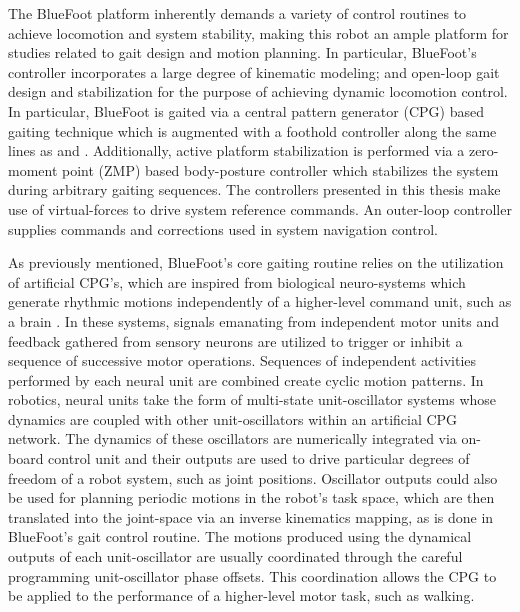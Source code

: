 		The BlueFoot platform inherently demands a variety of control routines to achieve locomotion and system stability, making this robot an ample platform for studies related to gait design and motion planning. In particular, BlueFoot's controller incorporates a large degree of kinematic modeling; and open-loop gait design and stabilization for the purpose of achieving dynamic locomotion control. In particular, BlueFoot is gaited via a central pattern generator (CPG) based gaiting technique which is augmented with a foothold controller along the same lines as \cite{Ajallooeian2013} and \cite{Rutishauser2008}. Additionally, active platform stabilization is performed via a zero-moment point (ZMP) based body-posture controller which stabilizes the system during arbitrary gaiting sequences. The controllers presented in this thesis make use of virtual-forces to drive system reference commands. An outer-loop controller supplies commands and corrections used in system navigation control.

		As previously mentioned, BlueFoot's core gaiting routine relies on the utilization of artificial CPG's, which are inspired from biological neuro-systems which generate rhythmic motions independently of a higher-level command unit, such as a brain \cite{Ijspeert2008}. In these systems, signals emanating from independent motor units and feedback gathered from sensory neurons are utilized to trigger or inhibit a sequence of successive motor operations. Sequences of independent activities performed by each neural unit are combined create cyclic motion patterns. In robotics, neural units take the form of multi-state unit-oscillator systems whose dynamics are coupled with other unit-oscillators within an artificial CPG network. The dynamics of these oscillators are numerically integrated via on-board control unit and their outputs are used to drive particular degrees of freedom of a robot system, such as joint positions. Oscillator outputs could also be used for planning periodic motions in the robot's task space, which are then translated into the joint-space via an inverse kinematics mapping, as is done in BlueFoot's gait control routine. The motions produced using the dynamical outputs of each unit-oscillator are usually coordinated through the careful programming unit-oscillator phase offsets. This coordination allows the CPG to be applied to the performance of a higher-level motor task, such as walking.

